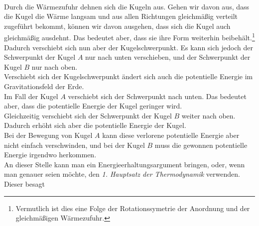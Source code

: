 \begin{Answer}
\begin{figure}[h]
	\centering
\end{figure}\\
Durch die Wärmezufuhr dehnen sich die Kugeln aus. Gehen wir davon aus, dass die Kugel die Wärme langsam und aus allen Richtungen gleichmäßig verteilt zugeführt bekommt, können wir davon ausgehen, dass sich die Kugel auch gleichmäßig ausdehnt. Das bedeutet aber, dass sie ihre Form weiterhin beibehält.\footnote[2]{Vermutlich ist dies eine Folge der Rotationssymetrie der Anordnung und der gleichmäßigen Wärmezufuhr.}
Dadurch verschiebt sich nun aber der Kugelschwerpunkt. Es kann sich jedoch der Schwerpunkt der Kugel $A$ nur nach unten verschieben, und der Schwerpunkt der Kugel $B$ nur nach oben. \\
Verschiebt sich der Kugelschwerpunkt ändert sich auch die potentielle Energie im Gravitationsfeld der Erde. \\
Im Fall der Kugel $A$ verschiebt sich der Schwerpunkt nach unten. Das bedeutet aber, dass die potentielle Energie der Kugel geringer wird. \\
Gleichzeitig verschiebt sich der Schwerpunkt der Kugel $B$ weiter nach oben. Dadurch erhöht sich aber die potentielle Energie der Kugel. \\
Bei der Bewegung von Kugel $A$ kann diese \glqq verlorene\grqq{} potentielle Energie aber nicht einfach verschwinden, und bei der Kugel $B$ muss die \glqq gewonnen\grqq{} potentielle Energie irgendwo herkommen. \\
An dieser Stelle kann man ein Energieerhaltungsargument bringen, oder, wenn man genauer seien möchte, den \textit{1. Hauptsatz der Thermodynamik} verwenden. Dieser besagt
\end{Answer}
